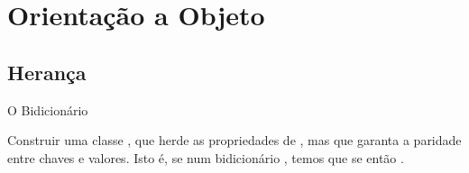 \chapter{Orientação a Objeto}

	\section*{Herança}

	\begin{problem}{O Bidicionário}
	
	\proposal
	Construir uma classe , que herde as propriedades de , mas que garanta a paridade entre chaves e valores. Isto é, se num bidicionário , temos que se  então .

	\end{problem}

	
